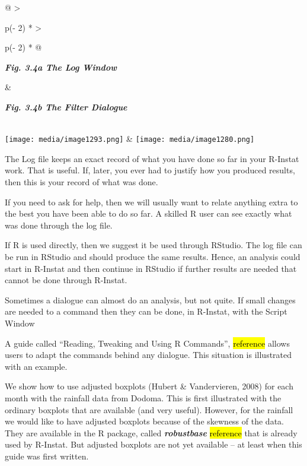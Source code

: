 \documentclass[
  letterpaper,
  DIV=11,
  numbers=noendperiod]{scrreprt}
\begin{document}
\begin{longtable}[]{@{}
  >{\raggedright\arraybackslash}p{(\columnwidth - 2\tabcolsep) * }
  >{\raggedright\arraybackslash}p{(\columnwidth - 2\tabcolsep) * }@{}}
\toprule\noalign{}
\begin{minipage}[b]{\linewidth}\raggedright
\textbf{\emph{Fig. 3.4a The Log Window}}
\end{minipage} & \begin{minipage}[b]{\linewidth}\raggedright
\textbf{\emph{Fig. 3.4b The Filter Dialogue}}
\end{minipage} \\
\midrule\noalign{}
\endhead
\bottomrule\noalign{}
\endlastfoot
\texttt{[image: media/image1293.png]} &
\texttt{[image: media/image1280.png]} \\
\end{longtable}

The Log file keeps an exact record of what you have done so far in your
R-Instat work. That is useful. If, later, you ever had to justify how
you produced results, then this is your record of what was done.

If you need to ask for help, then we will usually want to relate
anything extra to the best you have been able to do so far. A skilled R
user can see exactly what was done through the log file.

If R is used directly, then we suggest it be used through RStudio. The
log file can be run in RStudio and should produce the same results.
Hence, an analysis could start in R-Instat and then continue in RStudio
if further results are needed that cannot be done through R-Instat.

Sometimes a dialogue can almost do an analysis, but not quite. If small
changes are needed to a command then they can be done, in R-Instat, with
the Script Window

A guide called ``Reading, Tweaking and Using R Commands'',
\hl{reference} allows users to adapt the commands behind any dialogue.
This situation is illustrated with an example.

We show how to use adjusted boxplots (Hubert \& Vandervieren, 2008) for
each month with the rainfall data from Dodoma. This is first illustrated
with the ordinary boxplots that are available (and very useful).
However, for the rainfall we would like to have adjusted boxplots
because of the skewness of the data. They are available in the R
package, called \textbf{\emph{robustbase}} \hl{reference} that is
already used by R-Instat. But adjusted boxplots are not yet available --
at least when this guide was first written.
\end{document}
